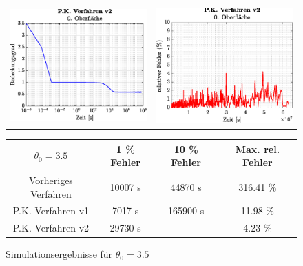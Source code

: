 \documentclass{listhesis}
\begin{document}
\begin{figure}[!h]
\begin{tabular}{@{}cc@{}}
\includegraphics[width=\wss\textwidth]{./include/figure_3.5/PC_new/CovFacet0.eps}&
\includegraphics[width=\wss\textwidth]{./include/figure_3.5/PC_new/CovFacetError0.eps}
\end{tabular}
\newline
\vspace*{0.5cm}
\newline
\begin{tabular}{|c|c|c|c|}
\hline
$\theta_0 = 3.5$ & 1 \% Fehler & 10 \% Fehler & Max. rel. Fehler\\
\hline
Vorheriges Verfahren & 10007 s & 44870 s & 316.41 \% \\
P.K. Verfahren v1 & 7017 s & 165900 s & 11.98 \% \\
P.K. Verfahren v2 & 29730 s & -- & 4.23 \% \\
\hline
\end{tabular}
\caption{Simulationsergebnisse für $\theta_0 = 3.5$}
\label{fig:figure_3.5}
\end{figure}
\end{document}
